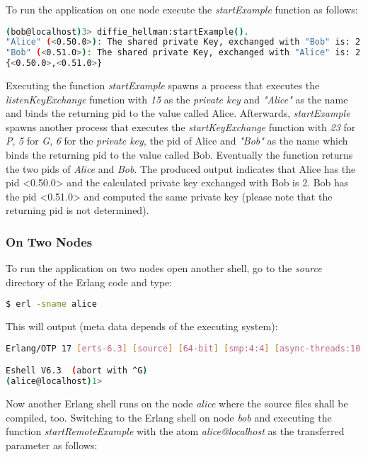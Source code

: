 \documentclass[xcolor=dvipsnames]{article}
\begin{document}
To run the application on one node execute the \textit{startExample} function as follows:

\begin{lstlisting}[language=bash]
(bob@localhost)3> diffie_hellman:startExample().
"Alice" (<0.50.0>): The shared private Key, exchanged with "Bob" is: 2
"Bob" (<0.51.0>): The shared private Key, exchanged with "Alice" is: 2
{<0.50.0>,<0.51.0>}
\end{lstlisting}

\noindent Executing the function \textit{startExample} spawns a process that executes the \textit{listenKeyExchange} function with \textit{15} as the \textit{private key} and \textit{"Alice"} as the name and binds the returning \gls{pid} to the value called Alice. Afterwards, \textit{startExample} spawns another process that executes the \textit{startKeyExchange} function with \textit{23} for \textit{P}, \textit{5} for \textit{G}, \textit{6} for the \textit{private key}, the \gls{pid} of Alice and \textit{"Bob"} as the name which binds the returning \gls{pid} to the value called Bob. Eventually the function returns the two pids of \textit{Alice} and \textit{Bob}. The produced output indicates that Alice has the \gls{pid} <0.50.0> and the calculated private key exchanged with Bob is 2. Bob has the \gls{pid} <0.51.0> and computed the same private key (please note that the returning \gls{pid} is not determined).

\subsubsection{On Two Nodes}

\noindent To run the application on two nodes open another shell, go to the \textit{source} directory of the Erlang code and type:

\begin{lstlisting}[language=bash, numbers=none]
$ erl -sname alice
\end{lstlisting}

\noindent This will output (meta data depends of the executing system):

\begin{lstlisting}[language=bash]
Erlang/OTP 17 [erts-6.3] [source] [64-bit] [smp:4:4] [async-threads:10] [hipe] [kernel-poll:false]

Eshell V6.3  (abort with ^G)
(alice@localhost)1>
\end{lstlisting}

\noindent Now another Erlang shell runs on the node \textit{alice} where the source files shall be compiled, too. Switching to the Erlang shell on node \textit{bob} and executing the function \textit{startRemoteExample} with the atom \textit{alice@localhost} as the transferred parameter as follows:
\end{document}
